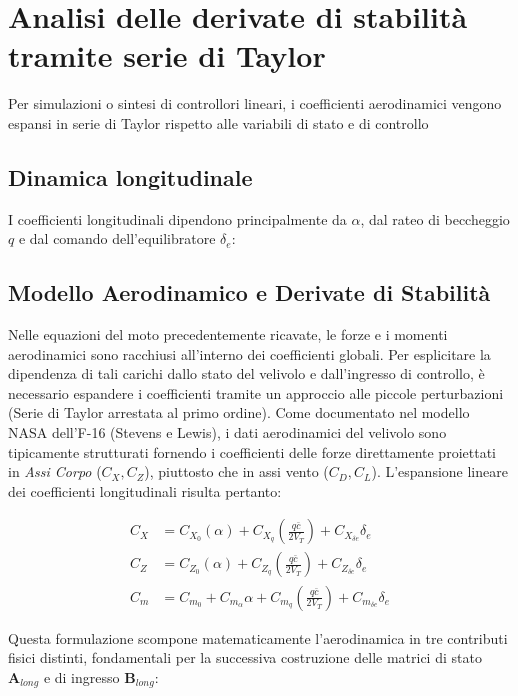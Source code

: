 \section{Analisi delle derivate di stabilità tramite serie di Taylor}
Per simulazioni o sintesi di controllori lineari, i coefficienti aerodinamici vengono espansi in serie di Taylor rispetto alle variabili di stato e di controllo

\subsection{Dinamica longitudinale}
\label{sec:coefficienti_aerodinamici}
I coefficienti longitudinali dipendono principalmente da $\alpha$, dal rateo di beccheggio $q$ e dal comando dell'equilibratore $\delta_e$:
\subsection{Modello Aerodinamico e Derivate di Stabilità}
\label{sec:derivate_aerodinamiche}

Nelle equazioni del moto precedentemente ricavate, le forze e i momenti aerodinamici sono racchiusi all'interno dei coefficienti globali. Per esplicitare la dipendenza di tali carichi dallo stato del velivolo e dall'ingresso di controllo, è necessario espandere i coefficienti tramite un approccio alle piccole perturbazioni (Serie di Taylor arrestata al primo ordine). Come documentato nel modello NASA dell'F-16 (Stevens e Lewis), i dati aerodinamici del velivolo sono tipicamente strutturati fornendo i coefficienti delle forze direttamente proiettati in \textit{Assi Corpo} ($C_X, C_Z$), piuttosto che in assi vento ($C_D, C_L$). L'espansione lineare dei coefficienti longitudinali risulta pertanto:

\begin{align}
	C_X &= C_{X_0}(\alpha) + C_{X_q} \left(\frac{q \bar{c}}{2 V_T}\right) + C_{X_{\delta e}} \delta_e \label{eq:Cx_exp} \\
	C_Z &= C_{Z_0}(\alpha) + C_{Z_q} \left(\frac{q \bar{c}}{2 V_T}\right) + C_{Z_{\delta e}} \delta_e \label{eq:Cz_exp} \\
	C_m &= C_{m_0} + C_{m_\alpha} \alpha + C_{m_q} \left(\frac{q \bar{c}}{2 V_T}\right) + C_{m_{\delta e}} \delta_e \label{eq:Cm_exp}
\end{align}

Questa formulazione scompone matematicamente l'aerodinamica in tre contributi fisici distinti, fondamentali per la successiva costruzione delle matrici di stato $\mathbf{A}_{long}$ e di ingresso $\mathbf{B}_{long}$:

